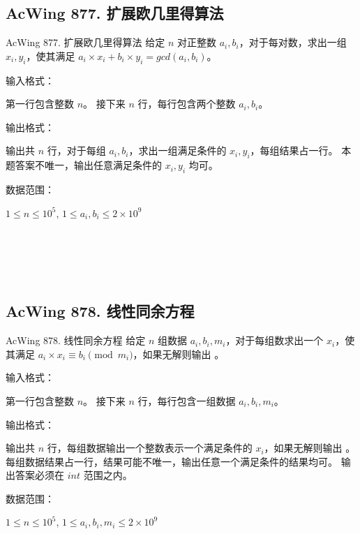 \subsection{AcWing 877. 扩展欧几里得算法}
\begin{titledbox}{AcWing 877. 扩展欧几里得算法}
    给定 $n$ 对正整数 $a_i, b_i$，对于每对数，求出一组 $x_i, y_i$，使其满足 $a_i \times x_i + b_i \times y_i = gcd(a_i, b_i)$。

    输入格式：

    第一行包含整数 $n$。 接下来 $n$ 行，每行包含两个整数 $a_i, b_i$。

    输出格式：

    输出共 $n$ 行，对于每组 $a_i, b_i$，求出一组满足条件的 $x_i, y_i$，每组结果占一行。 本题答案不唯一，输出任意满足条件的 $x_i, y_i$ 均可。

    数据范围：

    $1 \le n \le 10^5$, $1 \le a_i,b_i \le 2 \times 10^9$

    \begin{inputblock}
         \\
         \\
    \end{inputblock}
    \begin{outputblock}
         \\
    \end{outputblock}
\end{titledbox}

\subsection{AcWing 878. 线性同余方程}
\begin{titledbox}{AcWing 878. 线性同余方程}
    给定 $n$ 组数据 $a_i,b_i,m_i$，对于每组数求出一个 $x_i$，使其满足 $a_i \times x_i \equiv b_i \pmod {m_i}$，如果无解则输出 。

    输入格式：

    第一行包含整数 $n$。 接下来 $n$ 行，每行包含一组数据 $a_i,b_i,m_i$。

    输出格式：

    输出共 $n$ 行，每组数据输出一个整数表示一个满足条件的 $x_i$，如果无解则输出 。 每组数据结果占一行，结果可能不唯一，输出任意一个满足条件的结果均可。 输出答案必须在 $int$ 范围之内。

    数据范围：

    $1 \le n \le 10^5$, $1 \le a_i,b_i,m_i \le 2 \times 10^9$

    \begin{inputblock}
         \\
         \\
    \end{inputblock}
    \begin{outputblock}
         \\
    \end{outputblock}
\end{titledbox}


